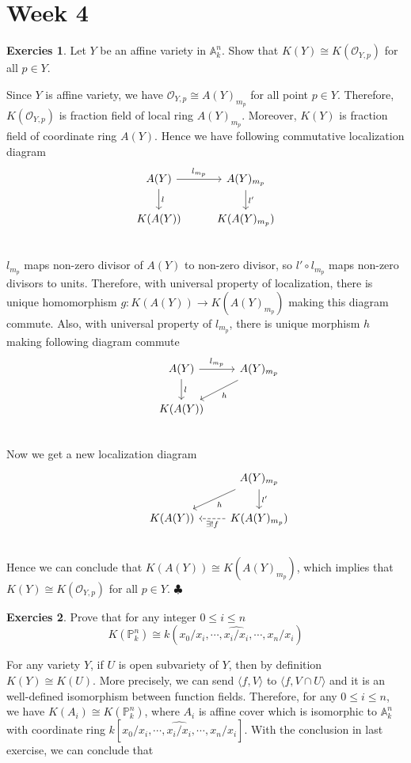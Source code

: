 \documentclass[12pt,a4paper]{article}
\theoremstyle{definition}
\newtheorem{exer}{Exercies}[section]
\newcommand*{\qeds}{\hfill\ensuremath{\clubsuit}}
\begin{document}
\section{Week 4}
\begin{exer}
	Let $Y$ be an affine variety in $\mathbb{A}^n_k$. Show that $K(Y) \cong K(\mathcal{O}_{Y,p})$ for all $p \in Y$.
\end{exer}
Since $Y$ is affine variety, we have $\mathcal{O}_{Y,p} \cong A(Y)_{m_p}$ for all point $p \in Y$. Therefore, $K(\mathcal{O}_{Y,p})$ is fraction field of local ring $A(Y)_{m_p}$. Moreover, $K(Y)$ is fraction field of coordinate ring $A(Y)$. Hence we have following commutative localization diagram
\[
\begin{tikzcd}
A(Y) \ar[r,"l_{m_p}"] \ar[d,"l"] & A(Y)_{m_p} \ar[d,"l'"]\\
K(A(Y)) & K(A(Y)_{m_p})\\
\end{tikzcd}
\]
$l_{m_p}$ maps non-zero divisor of $A(Y)$ to non-zero divisor, so $l' \circ l_{m_p}$ maps non-zero divisors to units. Therefore, with universal property of localization, there is unique homomorphism $g \colon K(A(Y)) \to K(A(Y)_{m_p})$ making this diagram commute. Also, with universal property of $l_{m_p}$, there is unique morphism $h$ making following diagram commute
\[
\begin{tikzcd}
&A(Y) \ar[r,"l_{m_p}"] \ar[d,"l"]& A(Y)_{m_p} \ar[ld,"h"] \\
&K(A(Y))& \\
\end{tikzcd}
\]
Now we get a new localization diagram
\[
\begin{tikzcd}
& &A(Y)_{m_p} \ar[d,"l'"] \ar[dl,"h"]\\
&K(A(Y)) & K(A(Y)_{m_p}) \ar[l,dashed,"\exists !f"]\\
\end{tikzcd}
\]
Hence we can conclude that $K(A(Y)) \cong K(A(Y)_{m_p})$, which implies that $K(Y) \cong K(\mathcal{O}_{Y,p})$ for all $p \in Y$. \qeds
\begin{exer}
	Prove that for any integer $0 \leq i \leq n$
	\[
	K(\mathbb{P}^n_k) \cong k(x_0/x_i, \cdots, \widehat{x_i/x_i}, \cdots, x_n/x_i)
	\]
\end{exer}
For any variety $Y$, if $U$ is open subvariety of $Y$, then by definition $K(Y) \cong K(U)$. More precisely, we can send $\langle f, V \rangle$ to $\langle f, V \cap U \rangle$ and it is an well-defined isomorphism between function fields. Therefore, for any $0 \leq i \leq n$, we have $K(A_i) \cong K(\mathbb{P}^n_k)$, where $A_i$ is affine cover which is isomorphic to $\mathbb{A}^n_k$ with coordinate ring $k[x_0/x_i, \cdots, \widehat{x_i/x_i}, \cdots, x_n/x_i]$. With the conclusion in last exercise, we can conclude that 
\end{document}

